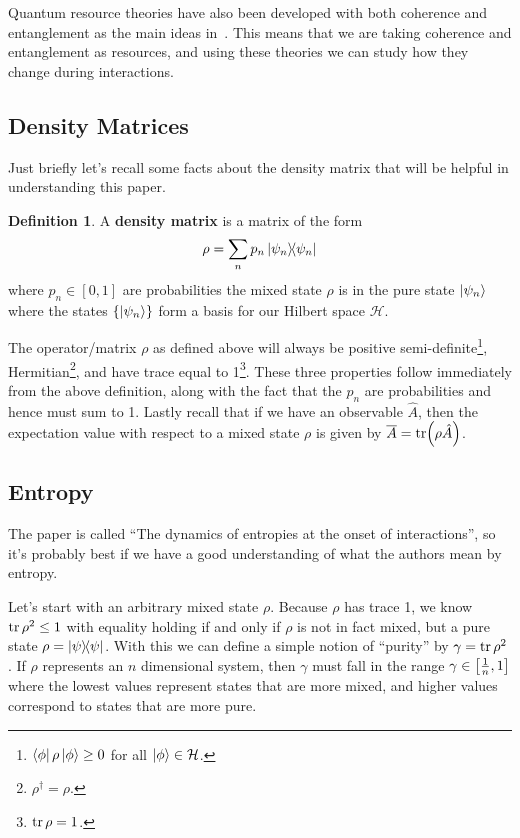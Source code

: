\documentclass[11pt,english]{article}
\theoremstyle{definition}
\newtheorem{definition}{Definition}[section]
\begin{document}
Quantum resource theories have also been developed with both coherence and entanglement as the main ideas in~\cite{quantum-resources}. This means that we are taking coherence and entanglement as resources, and using these theories we can study how they change during interactions.

\subsection{Density Matrices}\label{sec:density-matrices}
Just briefly let's recall some facts about the density matrix that will be helpful in understanding this paper.
\begin{definition}
	A \textbf{density matrix} is a matrix of the form
	\begin{equation*}
		\rho = \sum_n p_n\ketbra{\psi_n}
	\end{equation*}
	where $p_n\in[0,1]$ are probabilities the mixed state $\rho$ is in the pure state $\ket{\psi_n}$ where the states $\{\ket{\psi_n}\}$ form a basis for our Hilbert space $\mathcal{H}$.
\end{definition}
The operator/matrix $\rho$ as defined above will always be positive semi-definite\footnote{$\bra{\phi}\rho\ket{\phi}\geq 0$ for all $\ket{\phi}\in\mathcal{H}$.}, Hermitian\footnote{$\rho^\dagger = \rho$.}, and have trace equal to 1\footnote{$\tr\rho = 1$.}. These three properties follow immediately from the above definition, along with the fact that the $p_n$ are probabilities and hence must sum to 1. Lastly recall that if we have an observable $\hat{A}$, then the expectation value with respect to a mixed state $\rho$ is given by $\overline{A} = \tr(\rho\hat{A})$.

\subsection{Entropy}
The paper is called ``The dynamics of entropies at the onset of interactions'', so it's probably best if we have a good understanding of what the authors mean by entropy.

Let's start with an arbitrary mixed state $\rho$. Because $\rho$ has trace 1, we know $\tr\rho^2\leq 1$ with equality holding if and only if $\rho$ is not in fact mixed, but a pure state $\rho = \ketbra{\psi}$. With this we can define a simple notion of ``purity'' by $\gamma = \tr\rho^2$. If $\rho$ represents an $n$ dimensional system, then $\gamma$ must fall in the range $\gamma\in\qty[\frac{1}{n}, 1]$ where the lowest values represent states that are more mixed, and higher values correspond to states that are more pure.
\end{document}
